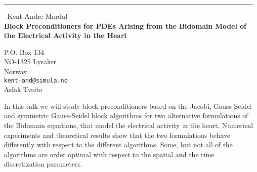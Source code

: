 \documentclass{report}
\begin{document}
\begin{center}
\rule{6in}{1pt} \
{\large Kent-Andre Mardal \\
{\bf Block Preconditioners for PDEs Arising from the Bidomain Model of the Electrical Activity in the Heart}}

P.O. Box 134  \\ NO-1325 Lysaker \\ Norway
\\
{\tt kent-and@simula.no}\\
Aslak Tveito\end{center}



In this talk we will study block preconditioners
based on the Jacobi, Gauss-Seidel and symmetric
Gauss-Seidel block algorithms for two alternative
formulations of the Bidomain equations, that
model the electrical activity in the heart.
Numerical experiments and theoretical
results show that the two formulations behave differently
with respect to the different algorithms. Some, but
not all of the algorithms are order optimal with respect
to the spatial and the time discretization parameters.
\end{document}
